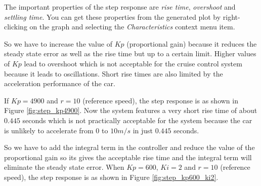 \documentclass[paper=letter, fontsize=11pt]{scrartcl}
\numberwithin{equation}{section}
\numberwithin{figure}{section}
\numberwithin{table}{section}
\begin{document}

\par
The important properties of
the step response are {\em rise time}, {\em overshoot} and {\em settling time}.
You can get these properties from the generated plot by right-clicking on the
graph and selecting the {\em Characteristics} context menu item.
\newline
\par
So we have to increase the value of $Kp$ (proportional gain) because it reduces
the steady state error as well as the rise time but up to a certain limit.
Higher values of $Kp$ lead to overshoot which is not acceptable for the cruise
control system because it leads to oscillations. Short rise times are also
limited by the acceleration performance of the car.
\newline
\par
If $Kp = 4900$ and $r =10$ (reference speed), the step response is as shown in
Figure \ref{fig:step_kp4900}.
Now the system features a very short rise time of about $0.445$ seconds which is
not practically acceptable for the system because the car is unlikely to
accelerate from $0$ to $10 m/s$ in just $0.445$ seconds.
\newline
\par
So we have to add the integral term in the controller and reduce the value
of the proportional gain so its gives the acceptable rise time and the integral
term will eliminate the steady state error. When $Kp = 600$, $Ki=2$ and
$r=10$ (reference speed), the step response is as shown in Figure
\ref{fig:step_kp600_ki2}.
\end{document}
